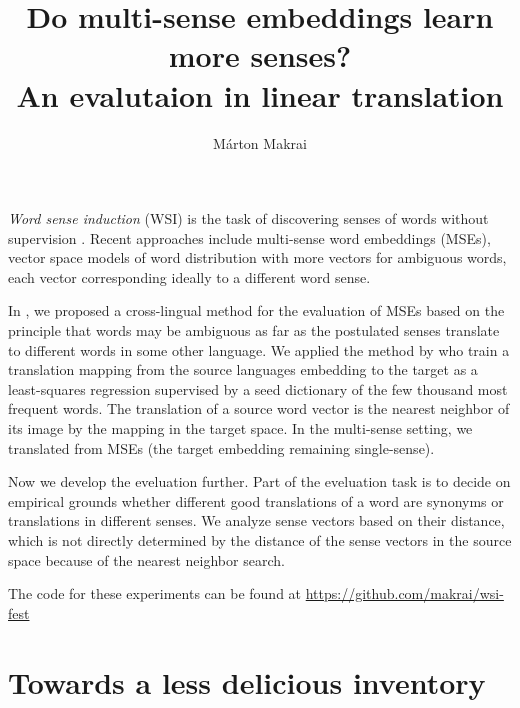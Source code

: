 \documentclass[11pt]{article}
\title{Do multi-sense embeddings learn more senses? \\ An evalutaion in linear
translation}
\author{
  Márton Makrai
}
\date{}
\begin{document}
\maketitle



\emph{Word sense induction} (WSI) is the task of discovering senses of words
without supervision \citep{Schutze:1998}. Recent approaches include multi-sense
word embeddings (MSEs), vector space models of word distribution with more
vectors for ambiguous words, each vector corresponding ideally to a different
word sense.

In \cite{Borbely:2016}, we proposed a cross-lingual method for the evaluation
of MSEs based on the principle that words may be ambiguous as far as the
postulated senses translate to different words in some other language.  We
applied the method by \citet{Mikolov:2013x} who train a translation mapping
from the source languages embedding to the target as a least-squares regression
supervised by a seed dictionary of the  few thousand most frequent words. The
translation of a source word vector is the nearest neighbor of its image by the
mapping in the target space. In the multi-sense setting, we translated from
MSEs (the target embedding remaining single-sense).

Now we develop the eveluation further. Part of the eveluation task is to decide
on empirical grounds whether different good translations of a word are synonyms
or translations in different senses.  We analyze sense vectors based on their
distance, which is not directly determined by the distance of the sense vectors
in the source space because of the nearest neighbor search.

The code for these experiments can be found at
\url{https://github.com/makrai/wsi-fest}

\section{%
  Towards a less delicious
  inventory}
\end{document}
